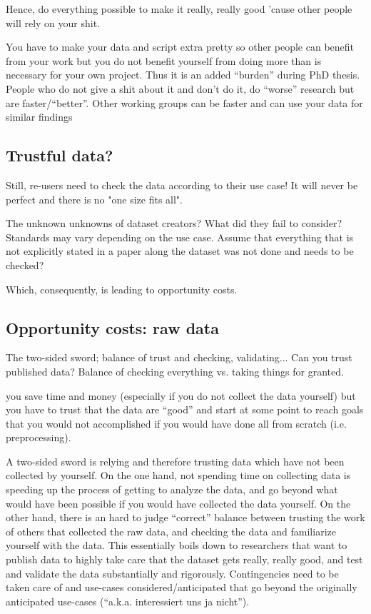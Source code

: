 %
Hence, do everything possible to make it really, really good 'cause other people
will rely on your shit.

%
You have to make your data and script extra pretty so other people can benefit
from your work but you do not benefit yourself from doing more than is necessary
for your own project.
%
Thus it is an added ``burden'' during PhD thesis.
%
People who do not give a shit about it and don't do it, do ``worse'' research
but are faster/``better''.
%
Other working groups can be faster and can use your data for similar findings


\subsection{Trustful data?}

%
Still, re-users need to check the data according to their use case! It will
never be perfect and there is no "one size fits all".

%
The unknown unknowns of dataset creators? What did they fail to consider?
Standards may vary depending on the use case. Assume that everything that is not
explicitly stated in a paper along the dataset was not done and needs to be
checked?

%
Which, consequently, is leading to opportunity costs.


\subsection{Opportunity costs: raw data}
%
The two-sided sword; balance of trust and checking, validating...
%
Can you trust published data? Balance of checking everything vs.  taking things
for granted.

%
you save time and money (especially if you do not collect the data yourself) but
you have to trust that the data are ``good'' and start at some point to reach
goals that you would not accomplished if you would have done all from scratch
(i.e. preprocessing).

%
A two-sided sword is relying and therefore trusting data which have not been
collected by yourself.
%
On the one hand, not spending time on collecting data is speeding up the process
of getting to analyze the data, and go beyond what would have been possible if
you would have collected the data yourself.
%
On the other hand, there is an hard to judge ``correct'' balance between
trusting the work of others that collected the raw data, and checking the data
and familiarize yourself with the data.
%
This essentially boils down to researchers that want to publish data to highly
take care that the dataset gets really, really good, and test and validate the
data substantially and rigorously.
%
Contingencies need to be taken care of and use-cases considered/anticipated that
go beyond the originally anticipated use-cases (``a.k.a. interessiert uns ja
nicht'').


